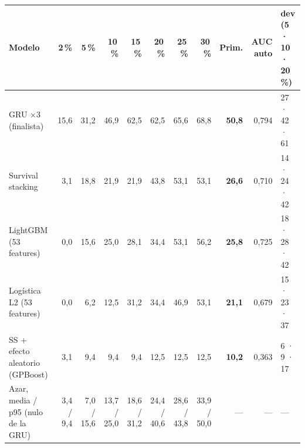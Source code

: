 \begin{tabular}{@{}lrrrrrrrrrl@{}}
\toprule
Modelo & 2\,\% & 5\,\% & 10\,\% & 15\,\% & 20\,\% & 25\,\% & 30\,\% & Prim. & AUC auto & dev (5 · 10 · 20\,\%) \\
\midrule
GRU ×3 (finalista) & 15,6 & 31,2 & 46,9 & 62,5 & 62,5 & 65,6 & 68,8 & \textbf{50,8} & 0,794 & 27 · 42 · 61 \\
Survival stacking & 3,1 & 18,8 & 21,9 & 21,9 & 43,8 & 53,1 & 53,1 & \textbf{26,6} & 0,710 & 14 · 24 · 42 \\
LightGBM (53 features) & 0,0 & 15,6 & 25,0 & 28,1 & 34,4 & 53,1 & 56,2 & \textbf{25,8} & 0,725 & 18 · 28 · 42 \\
Logística L2 (53 features) & 0,0 & 6,2 & 12,5 & 31,2 & 34,4 & 46,9 & 53,1 & \textbf{21,1} & 0,679 & 15 · 23 · 37 \\
SS + efecto aleatorio (GPBoost) & 3,1 & 9,4 & 9,4 & 9,4 & 12,5 & 12,5 & 12,5 & \textbf{10,2} & 0,363 & 6 · 9 · 17 \\
\midrule
Azar, media / p95 (nulo de la GRU) & 3,4 / 9,4 & 7,0 / 15,6 & 13,7 / 25,0 & 18,6 / 31,2 & 24,4 / 40,6 & 28,6 / 43,8 & 33,9 / 50,0 & — & — & — \\
\bottomrule
\end{tabular}
